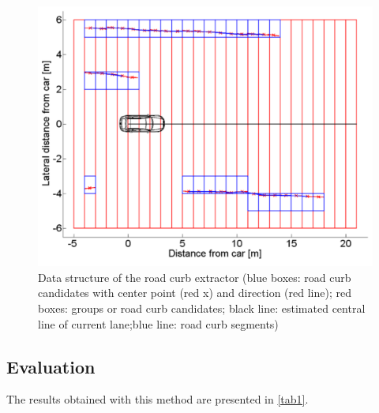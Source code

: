 \begin{figure}[H]
	\centering
  	\includegraphics[scale = 0.4]{pictures/extractor.pdf}
	\caption{Data structure of the road curb extractor (blue boxes: road curb candidates with center point (red x) and direction (red line); red boxes: groups or road curb candidates; black line: estimated central line of current lane;blue line: road curb segments) \cite{lidar13}}
	\label{fig5}
\end{figure}


\subsection{Evaluation}

The results obtained with this method are presented in \ref{tab1}.

\begin{table}[]
\centering
\caption{FPR and TPR Evaluation}
\label{tab1}
\end{table}

